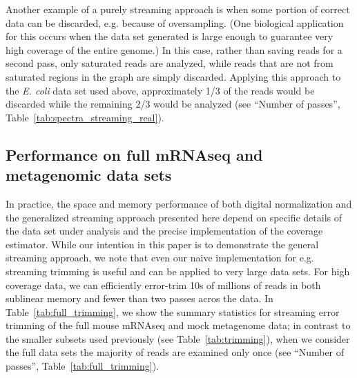 \documentclass{article}
\begin{document}
Another example of a purely streaming approach is when some portion of
correct data can be discarded, e.g. because of oversampling.  (One
biological application for this occurs when the data set generated is
large enough to guarantee very high coverage of the entire genome.)
In this case, rather than saving reads
for a second pass, only saturated reads are analyzed, while reads that are not from saturated regions in the
graph are simply discarded.
Applying this approach to the {\em E. coli} data set used above,
approximately 1/3 of the reads would be discarded while the remaining
2/3 would be analyzed (see ``Number of passes'',
Table~\ref{tab:spectra_streaming_real}).

\subsection{Performance on full mRNAseq and metagenomic data sets}

In practice, the space and memory performance of both digital
normalization and the generalized streaming approach presented here
depend on specific details of the data set under analysis and the
precise implementation of the coverage estimator. While our intention
in this paper is to demonstrate the general streaming approach, we
note that even our naive implementation for e.g. streaming trimming is
useful and can be applied to very large data sets.  For high coverage
data, we can efficiently error-trim 10s of millions of reads in both
sublinear memory and fewer than two passes acros the data.  In
Table~\ref{tab:full_trimming}, we show the summary statistics for
streaming error trimming of the full mouse mRNAseq and mock metagenome
data; in contrast to the smaller subsets used previously (see
Table~\ref{tab:trimming}), when we consider the full data sets the
majority of reads are examined only once (see ``Number of passes'',
Table~\ref{tab:full_trimming}).

\end{document}

